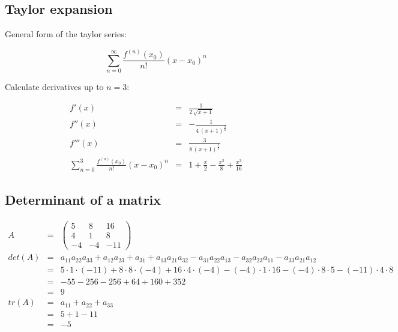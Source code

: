 \documentclass[11pt,a4paper]{article}
\begin{document}
\subsection{Taylor expansion}

General form of the taylor series:

\begin{displaymath}
\sum_{n=0}^\infty \frac{f^{(n)}(x_0)}{n!} (x - x_0)^n
\end{displaymath}

Calculate derivatives up to $n=3$:

\begin{eqnarray*}
f'(x)   &   = & \frac{1}{2 \, \sqrt{x + 1}}\\
f''(x)  &   = & - \frac{1}{4 \, (x + 1)^\frac{3}{2}}\\
f'''(x) &   = & \frac{3}{8 \, (x + 1)^\frac{5}{2}}\\
\sum_{n=0}^3 \frac{f^{(n)}(x_0)}{n!} (x - x_0)^n
        &   = & 1 + \frac{x}{2} - \frac{x^2}{8} + \frac{x^3}{16}
\end{eqnarray*}



\subsection{Determinant of a matrix}

\begin{eqnarray*}
A   &   = & \begin{pmatrix}
  5 &   8 &  16\\
  4 &   1 &   8\\
 -4 &  -4 & -11
\end{pmatrix}\\
det(A)  &   = & a_{11} a_{22} a_{33} + a_{12} a_{23} + a_{31} + a_{13} a_{21} a_{32}
            - a_{31} a_{22} a_{13} - a_{32} a_{23} a_{11} - a_{33} a_{21} a_{12}\\
        &   = & 5 \cdot 1 \cdot (-11) + 8 \cdot 8 \cdot (-4) + 16 \cdot 4 \cdot (-4)
            - (-4) \cdot 1 \cdot 16 - (-4) \cdot 8 \cdot 5 - (-11) \cdot 4 \cdot 8\\
        &   = & -55 - 256 - 256 + 64 + 160 + 352\\
        &   = & 9\\
tr(A)   &   = & a_{11} + a_{22} + a_{33}\\
        &   = & 5 + 1 - 11\\
        &   = & -5
\end{eqnarray*}
\end{document}
